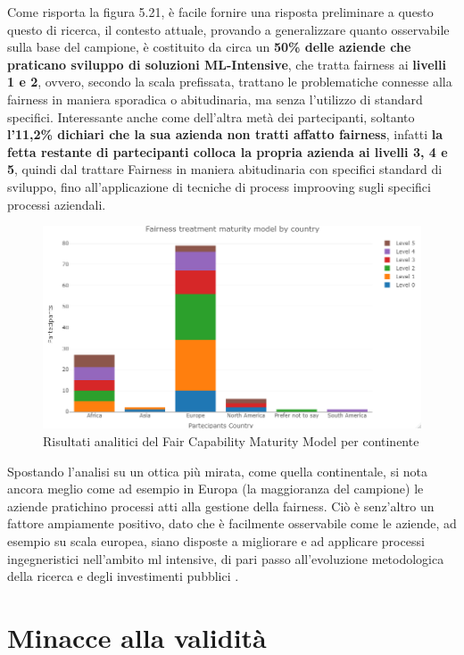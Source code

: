     Come risporta la figura 5.21, è facile fornire una risposta preliminare a questo questo di ricerca, il contesto attuale, provando a generalizzare quanto osservabile sulla base del campione, è costituito da circa un \textbf{50\% delle aziende che praticano sviluppo di soluzioni ML-Intensive}, che tratta fairness ai \textbf{livelli 1 e 2}, ovvero, secondo la scala prefissata, trattano le problematiche connesse alla fairness in maniera sporadica o abitudinaria, ma senza l'utilizzo di standard specifici. Interessante anche come dell'altra metà dei partecipanti, soltanto \textbf{l'11,2\% dichiari che la sua azienda non tratti affatto fairness}, infatti \textbf{la fetta restante di partecipanti colloca la propria azienda ai livelli 3, 4 e 5}, quindi dal trattare Fairness in maniera abitudinaria con specifici standard di sviluppo, fino all'applicazione di tecniche di process improoving sugli specifici processi aziendali. 
    
     \begin{figure}[h!]
        \centering
        \includegraphics[width=1\textwidth]{figure/Analisi/RQ5/Fairness treatment maturity model by country.png}
        \caption{Risultati analitici del Fair Capability Maturity Model per continente}
    \end{figure}
    
    Spostando l'analisi su un ottica più mirata, come quella continentale, si nota ancora meglio come ad esempio in Europa (la maggioranza del campione) le aziende pratichino processi atti alla gestione della fairness. Ciò è senz'altro un fattore ampiamente positivo, dato che è facilmente osservabile come le aziende, ad esempio su scala europea, siano disposte a migliorare e ad applicare processi ingegneristici nell'ambito ml intensive, di pari passo all'evoluzione metodologica della ricerca e degli investimenti pubblici \cite{ritson201317}.
    \section{Minacce alla validità}

\newpage

